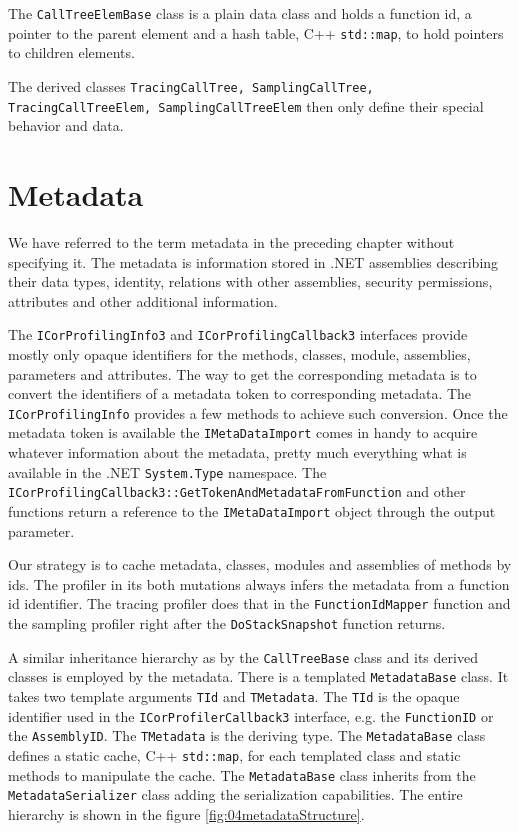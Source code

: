 The \texttt{CallTreeElemBase} class is a plain data class and holds a function id, a pointer to the parent element and a hash table, C++ \texttt{std::map}, to hold pointers to children elements.

The derived classes \texttt{TracingCallTree, SamplingCallTree, TracingCallTreeElem, SamplingCallTreeElem} then only define their special behavior and data. 

\section{Metadata}
We have referred to the term metadata in the preceding chapter without specifying it. The metadata is information stored in .NET assemblies describing their data types, identity, relations with other assemblies, security permissions, attributes and other additional information.

The \texttt{ICorProfilingInfo3} and \texttt{ICorProfilingCallback3} interfaces provide mostly only opaque identifiers for the methods, classes, module, assemblies, parameters and attributes. The way to get the corresponding metadata is to convert the identifiers of a metadata token to corresponding metadata. The \texttt{ICorProfilingInfo} provides a few methods to achieve such conversion. Once the metadata token is available the \texttt{IMetaDataImport} comes in handy \cite{ProfMSDNMetaData} to acquire whatever information about the metadata, pretty much everything what is available in the .NET \texttt{System.Type} namespace. The \texttt{ICorProfilingCallback3::GetTokenAndMetadataFromFunction} and other functions return a reference to the \texttt{IMetaDataImport} object through the output parameter. 

Our strategy is to cache metadata, classes, modules and assemblies of methods by ids. The profiler in its both mutations always infers the metadata from a function id identifier. The tracing profiler does that in the \texttt{FunctionIdMapper} function and the sampling profiler right after the \texttt{DoStackSnapshot} function returns.

A similar inheritance hierarchy as by the \texttt{CallTreeBase} class and its derived classes is employed by the metadata. There is a templated \texttt{MetadataBase} class. It takes two template arguments \texttt{TId} and \texttt{TMetadata}. The \texttt{TId} is the opaque identifier used in the \texttt{ICorProfilerCallback3} interface, e.g. the \texttt{FunctionID} or the \texttt{AssemblyID}. The \texttt{TMetadata} is the deriving type. The \texttt{MetadataBase} class defines a static cache, C++ \texttt{std::map}, for each templated class and static methods to manipulate the cache. The \texttt{MetadataBase} class inherits from the \texttt{MetadataSerializer} class adding the serialization capabilities. The entire hierarchy is shown in the figure \ref{fig:04metadataStructure}.

